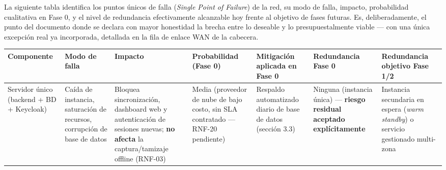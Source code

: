 \documentclass[11pt,a4paper]{article}
\begin{document}
La siguiente tabla identifica los puntos únicos de falla (\emph{Single Point of Failure}) de la red, su modo de falla, impacto, probabilidad cualitativa en Fase 0, y el nivel de redundancia efectivamente alcanzable hoy frente al objetivo de fases futuras. Es, deliberadamente, el punto del documento donde se declara con mayor honestidad la brecha entre lo deseable y lo presupuestalmente viable --- con una única excepción real ya incorporada, detallada en la fila de enlace WAN de la cabecera.

{\small
\begin{longtable}[]{@{}
  >{\raggedright\arraybackslash}p{}
  >{\raggedright\arraybackslash}p{}
  >{\raggedright\arraybackslash}p{}
  >{\raggedright\arraybackslash}p{}
  >{\raggedright\arraybackslash}p{}
  >{\raggedright\arraybackslash}p{}
  >{\raggedright\arraybackslash}p{}@{}}
\toprule\noalign{}
\begin{minipage}[b]{\linewidth}\raggedright
Componente
\end{minipage} & \begin{minipage}[b]{\linewidth}\raggedright
Modo de falla
\end{minipage} & \begin{minipage}[b]{\linewidth}\raggedright
Impacto
\end{minipage} & \begin{minipage}[b]{\linewidth}\raggedright
Probabilidad (Fase 0)
\end{minipage} & \begin{minipage}[b]{\linewidth}\raggedright
Mitigación aplicada en Fase 0
\end{minipage} & \begin{minipage}[b]{\linewidth}\raggedright
Redundancia Fase 0
\end{minipage} & \begin{minipage}[b]{\linewidth}\raggedright
Redundancia objetivo Fase 1/2
\end{minipage} \\
\midrule\noalign{}
\endhead
\bottomrule\noalign{}
\endlastfoot
Servidor único (backend + BD + Keycloak) & Caída de instancia, saturación de recursos, corrupción de base de datos & Bloquea sincronización, dashboard web y autenticación de sesiones nuevas; \textbf{no afecta} la captura/tamizaje offline (RNF-03) & Media (proveedor de nube de bajo costo, sin SLA contratado --- RNF-20 pendiente) & Respaldo automatizado diario de base de datos (sección 3.3) & Ninguna (instancia única) --- \textbf{riesgo residual aceptado explícitamente} & Instancia secundaria en espera (\emph{warm standby}) o servicio gestionado multi-zona \\

\end{longtable}}
\end{document}
